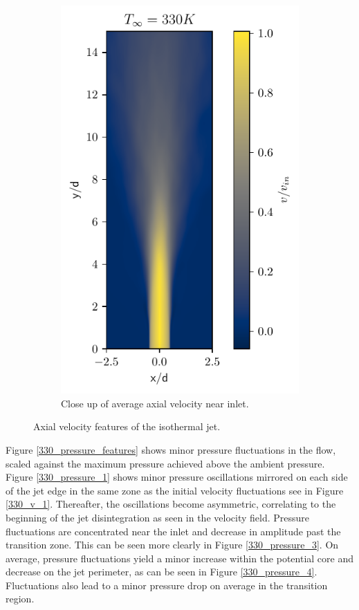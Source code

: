 \begin{figure}[htbp!]
\begin{subfigure}{0.25\textwidth}
	\includegraphics[scale=.65]{figures/Plots/vertical/330/v_scaled_vert_avg_330_zoom.pdf}
	\caption{Close up of average axial velocity near inlet.} \label{330_v_4}
\end{subfigure}
\caption{Axial velocity features of the isothermal jet.}
\label{330_v_features}
\end{figure}

Figure \ref{330_pressure_features} shows minor pressure fluctuations in the flow, scaled against the maximum pressure achieved above the ambient pressure. Figure \ref{330_pressure_1} shows minor pressure oscillations mirrored on each side of the jet edge in the same zone as the initial velocity fluctuations see in Figure \ref{330_v_1}. Thereafter, the oscillations become asymmetric, correlating to the beginning of the jet disintegration as seen in the velocity field. Pressure fluctuations are concentrated near the inlet and decrease in amplitude past the transition zone. This can be seen more clearly in Figure \ref{330_pressure_3}. On average, pressure fluctuations yield a minor increase within the potential core and decrease on the jet perimeter, as can be seen in Figure \ref{330_pressure_4}. Fluctuations also lead to a minor pressure drop on average in the transition region.  

